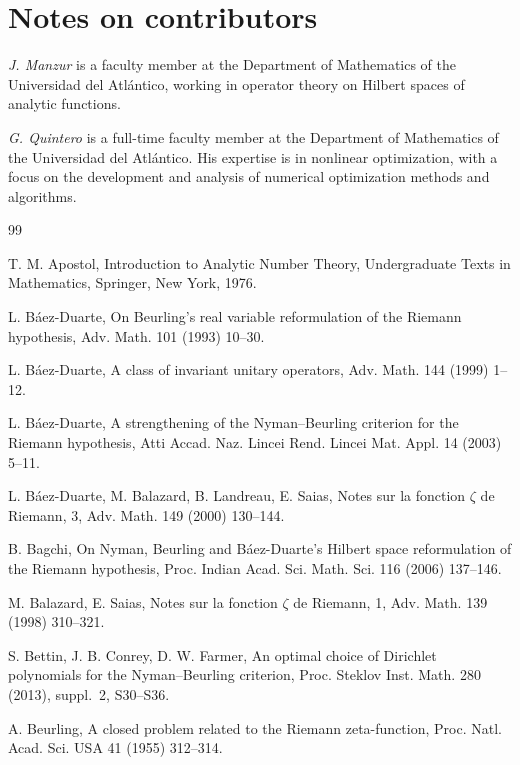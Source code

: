 \documentclass[11pt]{extarticle}
\numberwithin{equation}{section}
\theoremstyle{plain}
\theoremstyle{remark}
\begin{document}
\section*{Notes on contributors}
\textit{J. Manzur} is a faculty member at the Department of Mathematics of the
Universidad del Atl\'antico, working in operator theory on Hilbert spaces of analytic
functions.

\medskip
\noindent
\textit{G. Quintero} is a full-time faculty member at the Department of Mathematics of
the Universidad del Atl\'antico. His expertise is in nonlinear optimization, with a
focus on the development and analysis of numerical optimization methods and
algorithms.

\FloatBarrier

\begin{thebibliography}{99}

T. M. Apostol, Introduction to Analytic Number Theory, Undergraduate Texts in
Mathematics, Springer, New York, 1976.

L. B\'aez-Duarte, On Beurling's real variable reformulation of the Riemann hypothesis,
Adv. Math. 101 (1993) 10--30.

L. B\'aez-Duarte, A class of invariant unitary operators, Adv. Math. 144 (1999) 1--12.

L. B\'aez-Duarte, A strengthening of the Nyman--Beurling criterion for the Riemann
hypothesis, Atti Accad. Naz. Lincei Rend. Lincei Mat. Appl. 14 (2003) 5--11.

L. B\'aez-Duarte, M. Balazard, B. Landreau, E. Saias, Notes sur la fonction $\zeta$ de
Riemann, 3, Adv. Math. 149 (2000) 130--144.

B. Bagchi, On Nyman, Beurling and B\'aez-Duarte's Hilbert space reformulation of the
Riemann hypothesis, Proc. Indian Acad. Sci. Math. Sci. 116 (2006) 137--146.

M. Balazard, E. Saias, Notes sur la fonction $\zeta$ de Riemann, 1, Adv. Math. 139
(1998) 310--321.

S. Bettin, J. B. Conrey, D. W. Farmer, An optimal choice of Dirichlet polynomials for
the Nyman--Beurling criterion, Proc. Steklov Inst. Math. 280 (2013), suppl.~2,
S30--S36.

A. Beurling, A closed problem related to the Riemann zeta-function, Proc. Natl. Acad.
Sci. USA 41 (1955) 312--314.


\end{thebibliography}
\end{document}
